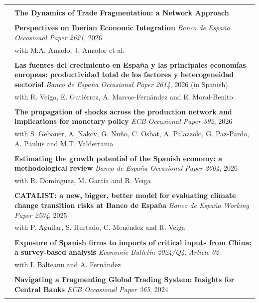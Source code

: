 \documentclass[letterpaper, 11pt]{article}
\begin{document}
\begin{longtable}{p{1.3in}p{4.8in}}
& \\
\color{OliveGreen}{Work in Progress}
& \textbf{The Dynamics of Trade Fragmentation: a Network Approach} \\
& \\
\color{OliveGreen}{Policy Works}
& \textbf{Perspectives on Iberian Economic Integration} \textit{Banco de España Occasional Paper 2621}, 2026 \\
& with M.A. Amado, J. Amador et al. \\
& \\
& \textbf{Las fuentes del crecimiento en España y las principales economías europeas: productividad total de los factores y heterogeneidad sectorial} \textit{Banco de España Occasional Paper 2614}, 2026 (in Spanish) \\
& with R. Veiga, E. Gutiérrez, A. Marcos-Fernández and E. Moral-Benito \\
& \\
& \textbf{The propagation of shocks across the production network and implications for monetary policy} \textit{ECB Occasional Paper 392}, 2026 \\
& with S. Gebauer, A. Nakov, G. Nuño, C. Osbat, A. Palazzolo, G. Paz-Pardo, A. Paulus and M.T. Valderrama \\
& \\
& \textbf{Estimating the growth potential of the Spanish economy: a methodological review} \textit{Banco de España Occasional Paper 2604}, 2026 \\
& with R. Domínguez, M. García and R. Veiga \\
& \\
& \textbf{CATALIST: a new, bigger, better model for evaluating climate change transition risks at Banco de España} \textit{Banco de España Working Paper 2504}, 2025 \\
& with P. Aguilar, S. Hurtado, C. Menéndez and R. Veiga \\
& \\
& \textbf{Exposure of Spanish firms to imports of critical inputs from China: a survey-based analysis} \textit{Economic Bulletin 2024/Q4, Article 02} \\
& with I. Balteanu and A. Fernández \\
& \\
& \textbf{Navigating a Fragmenting Global Trading System: Insights for Central Banks} \textit{ECB Occasional Paper 365}, 2024 \\
& \\

\end{longtable}
\end{document}
